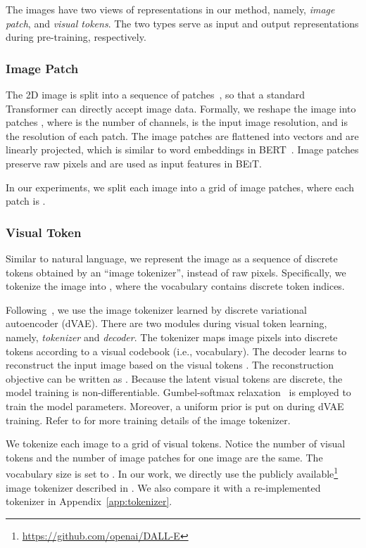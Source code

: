 \documentclass{article}
\newcommand\our{\textsc{BEiT}}
\begin{document}
The images have two views of representations in our method, namely, \textit{image patch}, and \textit{visual tokens}.
The two types serve as input and output representations during pre-training, respectively.

\subsubsection{Image Patch}
\label{sec:image:patch}

The 2D image is split into a sequence of patches~\citep{vit}, so that a standard Transformer can directly accept image data.
Formally, we reshape the image  into  patches , where  is the number of channels,  is the input image resolution, and  is the resolution of each patch.
The image patches  are flattened into vectors and are linearly projected, which is similar to word embeddings in BERT~\citep{bert}.
Image patches preserve raw pixels and are used as input features in \our{}.

In our experiments, we split each  image into a  grid of image patches, where each patch is .

\subsubsection{Visual Token}
\label{sec:visual:token}

Similar to natural language, we represent the image as a sequence of discrete tokens obtained by an ``image tokenizer'', instead of raw pixels.
Specifically, we tokenize the image  into , where the vocabulary  contains discrete token indices.

Following~\citep{dalle}, we use the image tokenizer learned by discrete variational autoencoder (dVAE).
There are two modules during visual token learning, namely, \textit{tokenizer} and \textit{decoder}.
The tokenizer  maps image pixels  into discrete tokens  according to a visual codebook (i.e., vocabulary).
The decoder  learns to reconstruct the input image  based on the visual tokens .
The reconstruction objective can be written as .
Because the latent visual tokens are discrete, the model training is non-differentiable.
Gumbel-softmax relaxation~\citep{gumbel:Jang,gumbel:Maddison} is employed to train the model parameters.
Moreover, a uniform prior is put on  during dVAE training.
Refer to \citep{dalle} for more training details of the image tokenizer.

We tokenize each image to a  grid of visual tokens.
Notice the number of visual tokens and the number of image patches for one image are the same.
The vocabulary size is set to .
In our work, we directly use the publicly available\footnote{\url{https://github.com/openai/DALL-E}} image tokenizer described in \citep{dalle}.
We also compare it with a re-implemented tokenizer in Appendix~\ref{app:tokenizer}.
\end{document}
